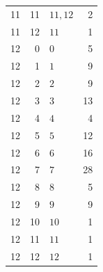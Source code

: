 \begin{longtable}{rrlr}
11 & 11 & $11,12$ & 2\\
11 & 12 & $11$ & 1\\
12 & 0 & $0$ & 5\\
12 & 1 & $1$ & 9\\
12 & 2 & $2$ & 9\\
12 & 3 & $3$ & 13\\
12 & 4 & $4$ & 4\\
12 & 5 & $5$ & 12\\
12 & 6 & $6$ & 16\\
12 & 7 & $7$ & 28\\
12 & 8 & $8$ & 5\\
12 & 9 & $9$ & 9\\
12 & 10 & $10$ & 1\\
12 & 11 & $11$ & 1\\
12 & 12 & $12$ & 1\\
\end{longtable}
\endgroup
